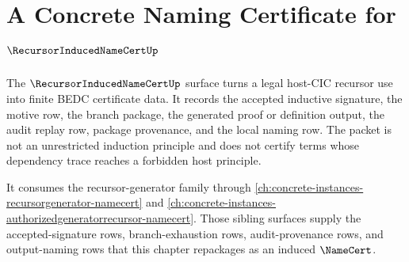 \chapter{A Concrete Naming Certificate for $\RecursorInducedNameCertUp$}
\label{ch:concrete-instances-recursorinducednamecert-namecert}

The $\RecursorInducedNameCertUp$ surface turns a legal host-CIC recursor use into finite BEDC certificate data. It records the accepted inductive signature, the motive row, the branch package, the generated proof or definition output, the audit replay row, package provenance, and the local naming row. The packet is not an unrestricted induction principle and does not certify terms whose dependency trace reaches a forbidden host principle.

It consumes the recursor-generator family through
\autoref{ch:concrete-instances-recursorgenerator-namecert} and
\autoref{ch:concrete-instances-authorizedgeneratorrecursor-namecert}. Those
sibling surfaces supply the accepted-signature rows, branch-exhaustion rows,
audit-provenance rows, and output-naming rows that this chapter repackages as
an induced $\NameCert$.

